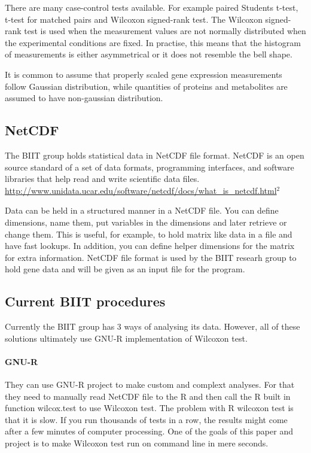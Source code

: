 \documentclass[12pt]{article}
\begin{document}
There are many case-control tests available. For example paired Students t-test, t-test for matched pairs and Wilcoxon signed-rank test. The Wilcoxon signed-rank test is used when the measurement values are not normally distributed when the experimental conditions are fixed.  In practise, this means that the histogram of measurements is either asymmetrical or it does not resemble the bell shape.

It is common to assume that properly scaled gene expression measurements follow Gaussian distribution, while quantities of proteins and metabolites are assumed to have non-gaussian distribution.

\subsection{NetCDF}
The BIIT group holds statistical data in NetCDF file format. NetCDF is an open source standard of a set of data formats, programming interfaces, and software libraries that help read and write scientific data files. \url{http://www.unidata.ucar.edu/software/netcdf/docs/what_is_netcdf.html}$^2$

Data can be held in a structured manner in a NetCDF file. You can define dimensions, name them, put variables in the dimensions and later retrieve or change them. This is useful, for example, to hold matrix like data in a file and have fast lookups. In addition, you can define helper dimensions for the matrix for extra information.
NetCDF file format is used by the BIIT researh group to hold gene data and will be given as an input file for the program.

\subsection{Current BIIT procedures}
Currently the BIIT group has 3 ways of analysing its data. However, all of these solutions ultimately use GNU-R implementation of Wilcoxon test.
\paragraph{GNU-R}
They can use GNU-R project to make custom and complext analyses. For that they need to manually read NetCDF file to the R and then call the R built in function wilcox.test to use Wilcoxon test. The problem with R wilcoxon test is that it is slow. If you run thousands of tests in a row, the results might come after a few minutes of computer processing. One of the goals of this paper and project is to make Wilcoxon test run on command line in mere seconds.
\end{document}
